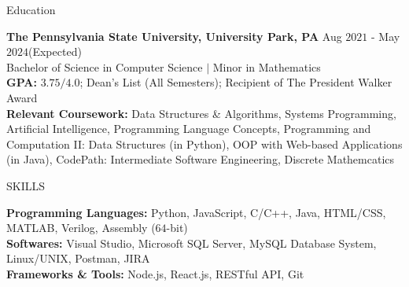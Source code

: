 \documentclass{resume} %
\begin{document}

\begin{rSection}{Education}

{\bf The Pennsylvania State University, University Park, PA} \hfill {Aug $2021$ - May $2024$(Expected)}\\
{Bachelor of Science in Computer Science $\vert$ Minor in Mathematics}\\
{\bf GPA:} $3.75/4.0$; Dean's List (All Semesters); Recipient of The President Walker Award\\
{\bf Relevant Coursework:} Data Structures \& Algorithms, Systems Programming, Artificial Intelligence, Programming Language Concepts, Programming and Computation II: Data Structures (in Python), OOP with Web-based Applications (in Java), CodePath: Intermediate Software Engineering, Discrete Mathemcatics
\end{rSection}


\begin{rSection}{SKILLS}

{\bf Programming Languages:} Python, JavaScript, C/C++, Java, HTML/CSS, MATLAB, Verilog, Assembly ($64$-bit)\\
{\bf Softwares:} Visual Studio, Microsoft SQL Server, MySQL Database System, Linux/UNIX, Postman, JIRA\\
{\bf Frameworks \& Tools:} Node.js, React.js, RESTful API, Git

\end{rSection}
\end{document}
